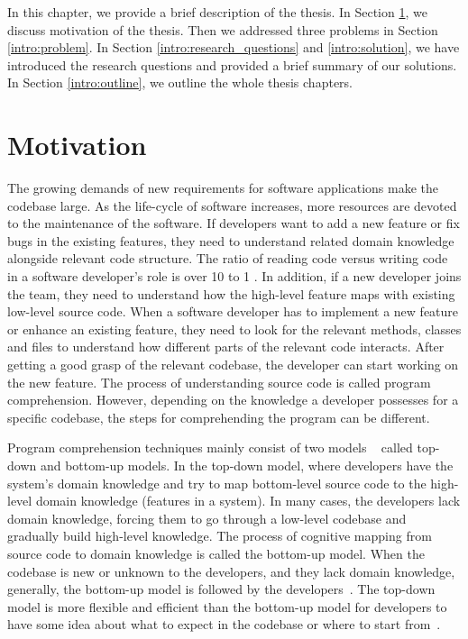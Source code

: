 In this chapter, we provide a brief description of the thesis. In Section \ref{intro:motivation}, we discuss motivation of the thesis. Then we addressed three problems in Section \ref{intro:problem}. In Section \ref{intro:research_questions} and \ref{intro:solution}, we have introduced the research questions and provided a brief summary of our solutions. In Section \ref{intro:outline}, we outline the whole thesis chapters. 


\section{Motivation}
\label{intro:motivation}
  The growing demands of new requirements for software applications make the codebase large. As the life-cycle of software increases, more resources are devoted to the maintenance of the software. If developers want to add a new feature or fix bugs in the existing features, they need to understand related domain knowledge alongside relevant code structure. The ratio of reading code versus writing code in a software developer's role is over 10 to 1 \cite{martin2008clean}. In addition, if a new developer joins the team, they need to understand how the high-level feature maps with existing low-level source code. When a software developer has to implement a new feature or enhance an existing feature, they need to look for the relevant methods, classes and files to understand how different parts of the relevant code interacts. After getting a good grasp of the relevant codebase, the developer can start working on the new feature. The process of understanding source code is called program comprehension. However, depending on the knowledge a developer possesses for a specific codebase, the steps for comprehending the program can be different.
 
 
Program comprehension techniques mainly consist of two models ~\cite{tilley1998reverseEngineeringFramework, von1993programToolRequirements, siegmund2016programPastFuture} called top-down and bottom-up models. In the top-down model, where developers have the system's domain knowledge and try to map bottom-level source code to the high-level domain knowledge (features in a system). In many cases, the developers lack domain knowledge, forcing them to go through a low-level codebase and gradually build high-level knowledge. The process of cognitive mapping from source code to domain knowledge is called the bottom-up model. When the codebase is new or unknown to the developers, and they lack domain knowledge, generally, the bottom-up model is followed by the developers~\cite{wei2002surveyCategorizationComprehension, siegmund2016programPastFuture}. The top-down model is more flexible and efficient than the bottom-up model for developers to have some idea about what to expect in the codebase or where to start from~\cite{brooks1983theoryComprehensionPrograms}. 
 
